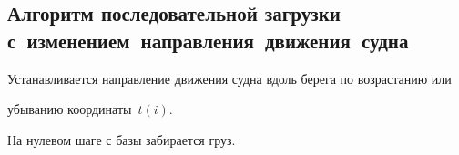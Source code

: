   


  \vspace*{-6pt}


  


\subsection{Алгоритм последовательной загрузки с~изменением~направления~движения~судна}





\vspace*{-2pt}





  Устанавливается направление движения судна вдоль берега по возрастанию или 


убыванию координаты~$t(i)$.


  


  На нулевом шаге с базы забирается груз. 



